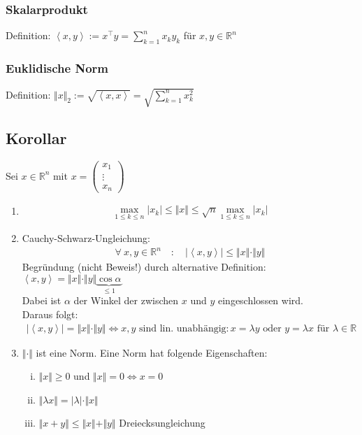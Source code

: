 \documentclass[11pt,a4paper]{book}
\newcommand {\R}	{\mathbb{R}}
\newcommand {\Rn}	{\mathbb{R}^n}
\newcommand{\1}    	{\mathbbm{1}}
\begin{document}
\section{}

\subsubsection*{Skalarprodukt}
Definition: \( \left< x,y \right> := x^\top y = \sum_{k=1}^n x_k y_k \) für \(x,y \in \Rn\)

\subsubsection*{Euklidische Norm}
Definition: \( \Vert x \Vert_2 := \sqrt{\left< x,x \right>} = \sqrt{\sum_{k=1}^n x_k^2} \)

\subsection{Korollar}
Sei \(x \in \Rn\) mit \(x = \left(\begin{array}{c} x_1 \\ \vdots \\ x_n \end{array}\right)\)
\begin{enumerate}[1.~]
	\item \begin{align*}
		\max_{1 \leqslant k \leqslant n} \vert x_k \vert \leqslant \Vert x \Vert \leqslant \sqrt{n} \max_{1 \leqslant k \leqslant n} \vert x_k \vert
	\end{align*}
	\item Cauchy-Schwarz-Ungleichung:
	\begin{align*}
		\forall~ x,y \in \Rn \quad : \quad \vert \left< x,y \right> \vert \leqslant \Vert x \Vert \cdot \Vert y \Vert
	\end{align*}
	Begründung (nicht Beweis!) durch alternative Definition: \( \left< x,y \right> = \Vert x \Vert \cdot \Vert y \Vert \underbrace{\cos \alpha}_{\leqslant 1} \) \\
	Dabei ist \(\alpha\) der Winkel der zwischen \(x\) und \(y\) eingeschlossen wird. \\
	Daraus folgt:
	\begin{align*}
		\vert \left< x,y \right> \vert = \Vert x \Vert \cdot \Vert y \Vert
		\Leftrightarrow
		x,y \textrm{ sind lin. unabhängig} : x = \lambda y \textrm{ oder } y = \lambda x \textrm{ für } \lambda \in \R
	\end{align*}
	\item \(\Vert \cdot \Vert\) ist eine Norm. Eine Norm hat folgende Eigenschaften:
	\begin{enumerate}[(i)]
		\item \( \Vert x \Vert \geqslant 0 \) und \( \Vert x \Vert = 0 \Leftrightarrow x = 0 \)
		\item \( \Vert \lambda x \Vert = \vert \lambda \vert \cdot \Vert x \Vert  \)
		\item \( \Vert x + y \Vert \leqslant \Vert x \Vert  + \Vert y \Vert \) Dreiecksungleichung
	\end{enumerate}
\end{enumerate}
\end{document}
